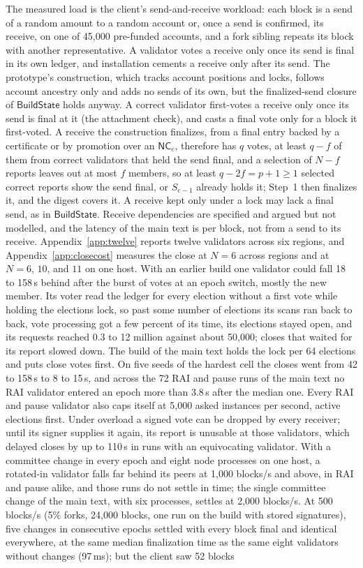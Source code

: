 \documentclass[conference]{IEEEtran}
\newcommand{\NC}{\mathsf{NC}}
\newcommand{\Build}{\mathsf{BuildState}}
\begin{document}
 The measured load is the client's send-and-receive workload: each block is a send of a random amount to a random account or, once a send is confirmed, its receive, on one of 45{,}000 pre-funded accounts, and a fork sibling repeats its block with another representative. A validator votes a receive only once its send is final in its own ledger, and installation cements a receive only after its send. The prototype's construction, which tracks account positions and locks, follows account ancestry only and adds no sends of its own, but the finalized-send closure of $\Build$ holds anyway. A correct validator first-votes a receive only once its send is final at it (the attachment check), and casts a final vote only for a block it first-voted. A receive the construction finalizes, from a final entry backed by a certificate or by promotion over an $\NC_e$, therefore has $q$ votes, at least $q-f$ of them from correct validators that held the send final, and a selection of $N-f$ reports leaves out at most $f$ members, so at least $q-2f=p+1\ge1$ selected correct reports show the send final, or $S_{e-1}$ already holds it; Step~1 then finalizes it, and the digest covers it. A receive kept only under a lock may lack a final send, as in $\Build$. Receive dependencies are specified and argued but not modelled, and the latency of the main text is per block, not from a send to its receive. Appendix~\ref{app:twelve} reports twelve validators across six regions, and Appendix~\ref{app:closecost} measures the close at $N=6$ across regions and at $N=6$, $10$, and $11$ on one host. With an earlier build one validator could fall 18 to 158\,s behind after the burst of votes at an epoch switch, mostly the new member. Its voter read the ledger for every election without a first vote while holding the elections lock, so past some number of elections its scans ran back to back, vote processing got a few percent of its time, its elections stayed open, and its requests reached 0.3 to 12 million against about 50{,}000; closes that waited for its report slowed down. The build of the main text holds the lock per 64 elections and puts close votes first. On five seeds of the hardest cell the closes went from 42 to 158\,s to 8 to 15\,s, and across the 72 RAI and pause runs of the main text no RAI validator entered an epoch more than 3.8\,s after the median one. Every RAI and pause validator also caps itself at 5{,}000 asked instances per second, active elections first. Under overload a signed vote can be dropped by every receiver; until its signer supplies it again, its report is unusable at those validators, which delayed closes by up to 110\,s in runs with an equivocating validator. With a committee change in every epoch and eight node processes on one host, a rotated-in validator falls far behind its peers at 1{,}000 blocks/s and above, in RAI and pause alike, and those runs do not settle in time; the single committee change of the main text, with six processes, settles at 2{,}000 blocks/s. At 500 blocks/s (5\% forks, 24{,}000 blocks, one run on the build with stored signatures), five changes in consecutive epochs settled with every block final and identical everywhere, at the same median finalization time as the same eight validators without changes (97\,ms); but the client saw 52 blocks 
\end{document}
